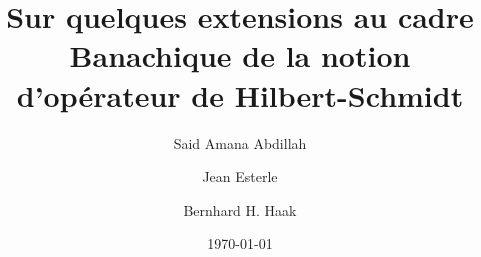 \documentclass{smfart}
\theoremstyle{plain}
\theoremstyle{definition}
\newcommand{\B}{{\mathcal B}}
\begin{document}
\title[Extensions Banachiques d'opérateurs de Hilbert-Schmidt]{Sur quelques extensions au cadre Banachique de la notion d'opérateur de Hilbert-Schmidt}
\date{\today}
 
\author[S.A. Abdillah]{Said Amana Abdillah} 
\address{Université des Comores\\Rue de la Corniche\\B.P2585 Moroni (Comores)}

\author[J. Esterle]{Jean Esterle}
\address{Institut de Mathématiques de Bordeaux\\Université Bordeaux 1\\351, cours de la Libération\\33405 Talence CEDEX\\FRANCE}
\author[B.H. Haak]{Bernhard H. Haak}
\address{Institut de Mathématiques de Bordeaux\\Université Bordeaux 1\\351, cours de la Libération\\33405 Talence CEDEX\\FRANCE}
\end{document}
